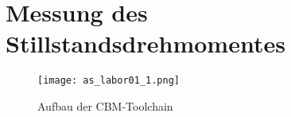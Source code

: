 \section{Messung des Stillstandsdrehmomentes}

\begin{figure}[htp]
 \centering
 \texttt{[image: as\_labor01\_1.png]}
 \caption{Aufbau der CBM-Toolchain}
 \label{fig:Plot Aufgabe 1}
\end{figure}


